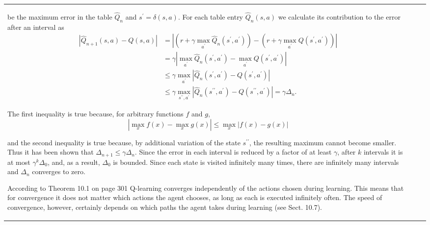 \documentclass[10pt]{book}
\begin{document}
\begin{center}
\begin{tabular}{|l|l|l|}
be the maximum error in the table $\hat{Q}_{n}$ and $s^{\prime}=\delta(s, a)$. For each table entry $\hat{Q}_{n}(s, a)$ we calculate its contribution to the error after an interval as
$$
\begin{aligned}
\left|\hat{Q}_{n+1}(s, a)-Q(s, a)\right| & =\left|\left(r+\gamma \max _{a^{\prime}} \hat{Q}_{n}\left(s^{\prime}, a^{\prime}\right)\right)-\left(r+\gamma \max _{a^{\prime}} Q\left(s^{\prime}, a^{\prime}\right)\right)\right| \\
& =\gamma\left|\max _{a^{\prime}} \hat{Q}_{n}\left(s^{\prime}, a^{\prime}\right)-\max _{a^{\prime}} Q\left(s^{\prime}, a^{\prime}\right)\right| \\
& \leq \gamma \max _{a^{\prime}}\left|\hat{Q}_{n}\left(s^{\prime}, a^{\prime}\right)-Q\left(s^{\prime}, a^{\prime}\right)\right| \\
& \leq \gamma \max _{s^{\prime \prime}, a^{\prime}}\left|\hat{Q}_{n}\left(s^{\prime \prime}, a^{\prime}\right)-Q\left(s^{\prime \prime}, a^{\prime}\right)\right|=\gamma \Delta_{n} .
\end{aligned}
$$

The first inequality is true because, for arbitrary functions $f$ and $g$,
$$
\left|\max _{x} f(x)-\max _{x} g(x)\right| \leq \max _{x}|f(x)-g(x)|
$$

and the second inequality is true because, by additional variation of the state $s^{\prime \prime}$, the resulting maximum cannot become smaller. Thus it has been shown that $\Delta_{n+1} \leq \gamma \Delta_{n}$. Since the error in each interval is reduced by a factor of at least $\gamma$, after $k$ intervals it is at most $\gamma^{k} \Delta_{0}$, and, as a result, $\Delta_{0}$ is bounded. Since each state is visited infinitely many times, there are infinitely many intervals and $\Delta_{n}$ converges to zero.

According to Theorem 10.1 on page 301 Q-learning converges independently of the actions chosen during learning. This means that for convergence it does not matter which actions the agent chooses, as long as each is executed infinitely often. The speed of convergence, however, certainly depends on which paths the agent takes during learning (see Sect. 10.7).


\end{tabular}
\end{center}
\end{document}
